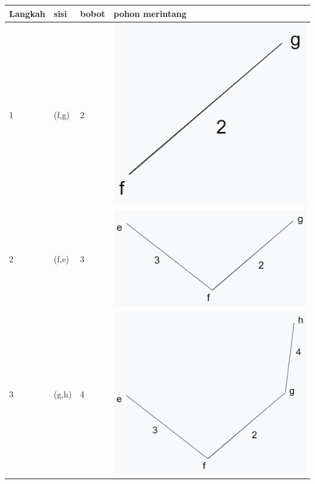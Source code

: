 \documentclass[12pt,titlepage]{article}
\begin{document}
\begin{tabular}{|m{}|m{}|m{}|m{}|}
    \hline
    Langkah & sisi & bobot & pohon merintang \\ 
    \hline
    1 & (f,g) & 2 & \includegraphics[width=.45\textwidth]{images/figures/fig4.png} \\ 
    \hline
    2 & (f,e) & 3 & \includegraphics[width=.45\textwidth]{images/figures/fig5.png} \\ 
    \hline
    3 & (g,h) & 4 & \includegraphics[width=.45\textwidth]{images/figures/fig6.png} \\ 
    \hline
\end{tabular}
\end{document}
